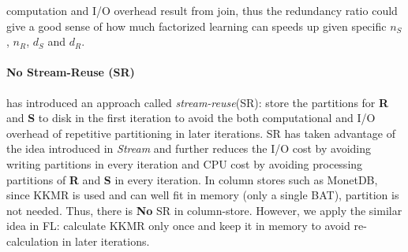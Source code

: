 \documentclass{vldb}
\begin{document}
computation and I/O overhead result from join, thus the redundancy ratio could give a good sense of how much factorized learning can speeds up given specific 
$n_S$, $n_R$, $d_S$ and $d_R$.
                                                                                                                                                                                                                                                                                                                                                                                                                                                                                                                                                                                                                                                                                                                                                                                                                                                                                                                                                                                                                                                                                                                                                                                                                                                                                                                                                                                                                                                                                                                                                                                                                                                                                                                                
\paragraph*{No Stream-Reuse (SR)}
\cite{Kumar} has introduced an approach called \textit{stream-reuse}(SR): store the partitions for \textbf{R} and \textbf{S} to disk in the first iteration to avoid the both computational and I/O overhead of repetitive partitioning in later iterations. SR has taken advantage of the idea introduced in \textit{Stream} and further reduces the I/O cost by avoiding writing partitions in every iteration and CPU cost by avoiding processing partitions of \textbf{R} and \textbf{S} in every iteration. In column stores such as MonetDB, since KKMR is used and can well fit in memory (only a single BAT), partition is not needed. Thus, there is \textbf{No} SR in column-store. However, we apply the similar idea in FL: calculate KKMR only once and keep it in memory to avoid re-calculation in later iterations.
\end{document}
